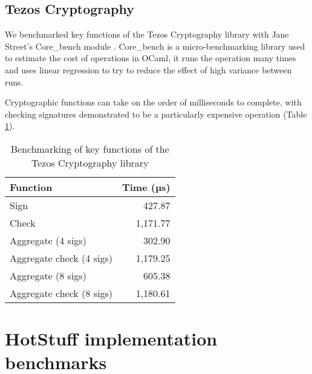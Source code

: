 \subsection{Tezos Cryptography} \label{tezosbenchmark}
We benchmarked key functions of the Tezos Cryptography library \cite{tezosCrypto} with Jane Street's Core\_bench module \cite{janestreetCoreBench2023}. Core\_bench is a micro-benchmarking library used to estimate the cost of operations in OCaml, it runs the operation many times and uses linear regression to try to reduce the effect of high variance between runs.

Cryptographic functions can take on the order of milliseconds to complete, with checking signatures demonstrated to be a particularly expensive operation (Table \ref{tezostable}).

\begin{table}[!h]
	\centering
	\begin{tabular}{|l|r|}
	\hline
	Function                 & Time (µs) \\ \hline
	Sign                     & 427.87   \\
	Check                    & 1,171.77 \\
	Aggregate (4 sigs)       & 302.90   \\
	Aggregate check (4 sigs) & 1,179.25 \\
	Aggregate (8 sigs)       & 605.38   \\
	Aggregate check (8 sigs) & 1,180.61 \\ \hline
	\end{tabular}
	\caption{Benchmarking of key functions of the Tezos Cryptography library}
	\label{tezostable}
\end{table}

\section{HotStuff implementation benchmarks} \label{hotstuffbenchmarks}

